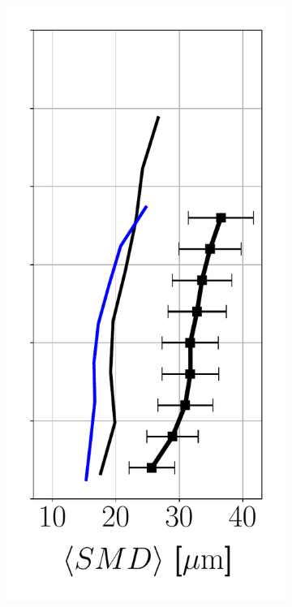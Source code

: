 \begin{figure}[h!]
\begin{subfigure}[b]{0.2\textwidth}
   \includegraphics[scale=0.35]{./part2_developments/figures_ch6_lagrangian_JICF/params_quadtrees/profiles/SMD_along_z}
\end{subfigure}
\hspace*{0.1in}

\end{figure}
